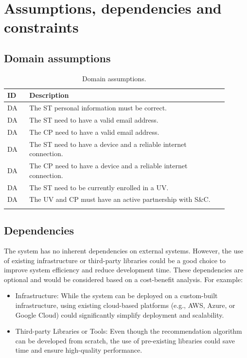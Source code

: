 \section{Assumptions, dependencies and constraints}
\label{sec:assumptions_dependencies_constraints}%

\subsection{Domain assumptions}
\label{subsec:domain_assumptions}%
\setcounter{da}{1}
\newcommand{\cda}{\theda\stepcounter{da}}
\begin{center}
    \begin{longtable}{ |l|p{0.9\linewidth}| }
        \hline
        \textbf{ID} & \textbf{Description} \\
        \hline
        DA\cda      & The ST personal information must be correct. \\
        \hline
        DA\cda      & The ST need to have a valid email address. \\
        \hline
        DA\cda      & The CP need to have a valid email address. \\
        \hline
        DA\cda      & The ST need to have a device and a reliable internet connection. \\
        \hline
        DA\cda      & The CP need to have a device and a reliable internet connection. \\
        \hline
        DA\cda      & The ST need to be currently enrolled in a UV. \\
        \hline
        DA\cda      & The UV and CP must have an active partnership with S\&C. \\
        \hline
        \caption{Domain assumptions.}
        \label{tab:domainassmptn_tab}%
    \end{longtable}
\end{center}

\subsection{Dependencies}
\label{subsec:dependencies}%
The system has no inherent dependencies on external systems. However, the use of existing infrastructure or third-party libraries could be a good choice to improve system efficiency and reduce development time. These dependencies are optional and would be considered based on a cost-benefit analysis. For example:
\begin{itemize}
    \item Infrastructure: While the system can be deployed on a custom-built infrastructure, using existing cloud-based platforms (e.g., AWS, Azure, or Google Cloud) could significantly simplify deployment and scalability.
    \item Third-party Libraries or Tools: Even though the recommendation algorithm can be developed from scratch, the use of pre-existing libraries could save time and ensure high-quality performance.
\end{itemize}

